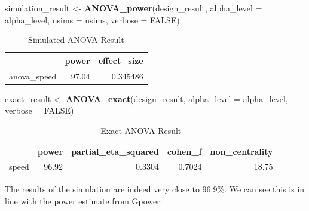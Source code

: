 \documentclass[]{book}
\newenvironment{Shaded}{\begin{snugshade}}{\end{snugshade}}
\newcommand{\DataTypeTok}[1]{\textcolor[rgb]{0.13,0.29,0.53}{#1}}
\newcommand{\KeywordTok}[1]{\textcolor[rgb]{0.13,0.29,0.53}{\textbf{#1}}}
\newcommand{\NormalTok}[1]{#1}
\newcommand{\OtherTok}[1]{\textcolor[rgb]{0.56,0.35,0.01}{#1}}
\newcommand{\StringTok}[1]{\textcolor[rgb]{0.31,0.60,0.02}{#1}}
\begin{document}
\begin{Shaded}
\begin{Highlighting}[]
\NormalTok{simulation_result <-}\StringTok{ }\KeywordTok{ANOVA_power}\NormalTok{(design_result, }
                                 \DataTypeTok{alpha_level =}\NormalTok{ alpha_level, }
                                 \DataTypeTok{nsims =}\NormalTok{ nsims,}
                                 \DataTypeTok{verbose =} \OtherTok{FALSE}\NormalTok{)}
\end{Highlighting}
\end{Shaded}

\begin{table}[!h]

\caption{\label{tab:unnamed-chunk-111}Simulated ANOVA Result}
\centering
\begin{tabular}{l|r|r}
\hline
  & power & effect\_size\\
\hline
anova\_speed & 97.04 & 0.345486\\
\hline
\end{tabular}
\end{table}

\begin{Shaded}
\begin{Highlighting}[]
\NormalTok{exact_result <-}\StringTok{ }\KeywordTok{ANOVA_exact}\NormalTok{(design_result,}
                            \DataTypeTok{alpha_level =}\NormalTok{ alpha_level,}
                            \DataTypeTok{verbose =} \OtherTok{FALSE}\NormalTok{)}
\end{Highlighting}
\end{Shaded}

\begin{table}[!h]

\caption{\label{tab:unnamed-chunk-113}Exact ANOVA Result}
\centering
\begin{tabular}{l|r|r|r|r}
\hline
  & power & partial\_eta\_squared & cohen\_f & non\_centrality\\
\hline
speed & 96.92 & 0.3304 & 0.7024 & 18.75\\
\hline
\end{tabular}
\end{table}

The results of the simulation are indeed very close to 96.9\%. We can see this is in line with the power estimate from Gpower:
\end{document}
